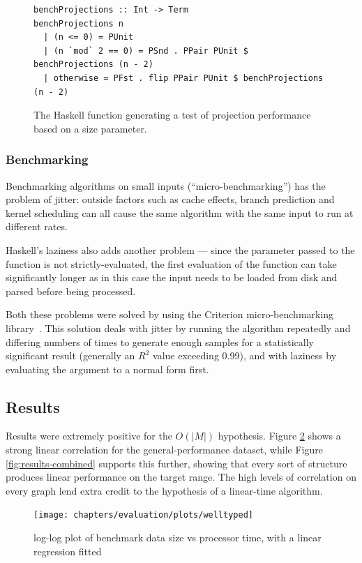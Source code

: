 \begin{figure}
\begin{verbatim}
benchProjections :: Int -> Term
benchProjections n
  | (n <= 0) = PUnit
  | (n `mod` 2 == 0) = PSnd . PPair PUnit $ benchProjections (n - 2)
  | otherwise = PFst . flip PPair PUnit $ benchProjections (n - 2)
\end{verbatim}
\caption{The Haskell function generating a test of projection performance based on a size parameter.}
\label{figure:projection-sample}
\end{figure}

\subsubsection{Benchmarking}
Benchmarking algorithms on small inputs (``micro-benchmarking'') has the problem of jitter: outside factors such as cache effects, branch prediction and kernel scheduling can all cause the same algorithm with the same input to run at different rates.

Haskell's laziness also adds another problem --- since the parameter passed to the function is not strictly-evaluated, the first evaluation of the function can take significantly longer as in this case the input needs to be loaded from disk and parsed before being processed.

Both these problems were solved by using the Criterion micro-benchmarking library~\cite{criterion}.
This solution deals with jitter by running the algorithm repeatedly and differing numbers of times to generate enough samples for a statistically significant result (generally an \(R^2\) value exceeding 0.99), and with laziness by evaluating the argument to a normal form first.

\subsection{Results}
Results were extremely positive for the \(O(|M|)\) hypothesis.
Figure \ref{fig:results-welltyped} shows a strong linear correlation for the general-performance dataset, while Figure \ref{fig:results-combined} supports this further, showing that every sort of structure produces linear performance on the target range.
The high levels of correlation on every graph lend extra credit to the hypothesis of a linear-time algorithm.

\begin{figure}
\centering
\texttt{[image: chapters/evaluation/plots/welltyped]}
\caption{log-log plot of benchmark data size vs processor time, with a linear regression fitted}
\label{fig:results-welltyped}
\end{figure}

